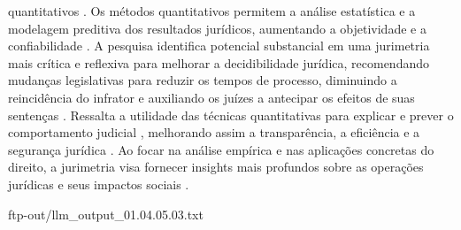 \begin{agradecimentos}
quantitativos \cite{ribeiro2021,restrepoamariles2015}. Os métodos quantitativos permitem a análise estatística e a modelagem preditiva dos resultados jurídicos, aumentando a objetividade e a confiabilidade \cite{ribeiro2021}. A pesquisa identifica potencial substancial em uma jurimetria mais crítica e reflexiva para melhorar a decidibilidade jurídica, recomendando mudanças legislativas para reduzir os tempos de processo, diminuindo a reincidência do infrator e auxiliando os juízes a antecipar os efeitos de suas sentenças \cite{nunes2018}. Ressalta a utilidade das técnicas quantitativas para explicar e prever o comportamento judicial \cite{luvizotto2020}, melhorando assim a transparência, a eficiência e a segurança jurídica \cite{silva2023}. Ao focar na análise empírica e nas aplicações concretas do direito, a jurimetria visa fornecer insights mais profundos sobre as operações jurídicas e seus impactos sociais \cite{nunes2018}. 
    
    ftp-out/llm_output_01.04.05.03.txt 
    

\end{agradecimentos}
